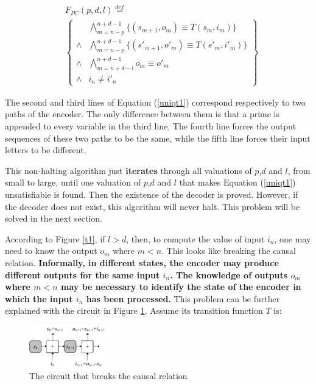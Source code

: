 \documentclass[journal]{IEEEtran}
\begin{document}
\begin{equation}\label{uniqt1}
\begin{split}
&F_{PC}(p,d,l)\overset{def}{=}\\
&\left\{
\begin{array}{cc}
&\bigwedge_{m=n-p}^{n+d-1}
\{
(s_{m+1},o_m)\equiv T(s_m,i_m)
\}
\\
\wedge&\bigwedge_{m=n-p}^{n+d-1}
\{
(s'_{m+1},o'_m)\equiv T(s'_m,i'_m)
\}
\\
\wedge&\bigwedge_{m=n+d-l}^{n+d-1}o_m\equiv o'_m \\
\wedge&i_n\ne i'_n
\end{array}
\right\}
\end{split}
\end{equation}


The second and third lines of Equation (\ref{uniqt1}) correspond respectively to two paths of the encoder.
The only difference between them is that a prime is appended to every variable in the third line.
The fourth line forces the output sequences of these two paths to be the same,
while the fifth line forces their input letters to be different.

This non-halting algorithm\cite{ShengYuShen:iccad09} just \textbf{iterates} through all valuations of $p$,$d$ and $l$,
from small to large,
until one valuation of $p$,$d$ and $l$ that makes Equation (\ref{uniqt1}) unsatisfiable is found.
Then the existence of the decoder is proved.
However,
if the decoder does not exist,
this algorithm will never halt.
This problem will be solved in the next section.


According to Figure \ref{t1},
if  $l > d$, then,
to compute the value of  input $i_n$,
one may need to know the output $o_m$ where $m < n$.
This looks like breaking the causal relation.
\textbf{Informally,
in different states,
the encoder may produce different outputs for the same input $i_n$.
The knowledge of outputs $o_m$ where $m < n$ may be necessary to identify the state of the encoder in which the input $i_n$ has been processed.}
This problem can be further explained with the circuit in Figure \ref{mealy_add}.
Assume its transition function $T$ is:

\begin{figure}[t]
\begin{center}
\includegraphics[width=0.3\textwidth]{mealy_add}
\end{center}
\caption{The circuit that breaks the causal relation}
  \label{mealy_add}
\end{figure}
\end{document}
